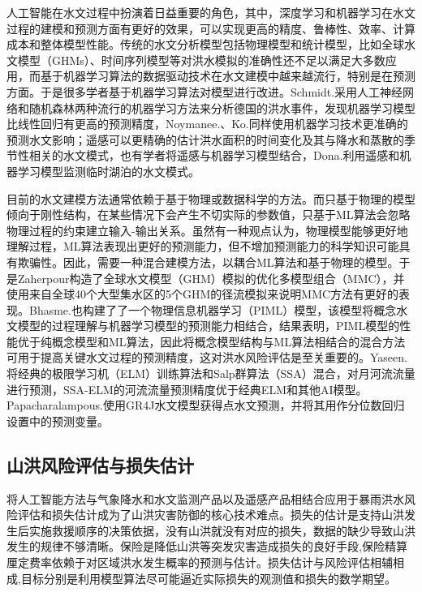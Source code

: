 \documentclass{ctexart}
\begin{document}
人工智能在水文过程中扮演着日益重要的角色\cite{nearing2021role}，其中，深度学习和机器学习在水文过程的建模和预测方面有更好的效果，可以实现更高的精度、鲁棒性、效率、计算成本和整体模型性能\cite{ardabili2019deep}。传统的水文分析模型包括物理模型和统计模型，比如全球水文模型（GHMs）、时间序列模型等对洪水模拟的准确性还不足以满足大多数应用，而基于机器学习算法的数据驱动技术在水文建模中越来越流行，特别是在预测方面\cite{carbajal2018overview}。于是很多学者基于机器学习算法对模型进行改进。Schmidt.\cite{schmidt2020challenges}采用人工神经网络和随机森林两种流行的机器学习方法来分析德国的洪水事件，发现机器学习模型比线性回归有更高的预测精度，Noymanee.\cite{noymanee2019flood}、Ko.\cite{ko2020development}同样使用机器学习技术更准确的预测水文影响；遥感可以更精确的估计洪水面积的时间变化及其与降水和蒸散的季节性相关的水文模式，也有学者将遥感与机器学习模型结合，Dona.\cite{dona2016monitoring}利用遥感和机器学习模型监测临时湖泊的水文模式。

目前的水文建模方法通常依赖于基于物理或数据科学的方法。而只基于物理的模型倾向于刚性结构，在某些情况下会产生不切实际的参数值，只基于ML算法会忽略物理过程的约束建立输入-输出关系。虽然有一种观点认为，物理模型能够更好地理解过程，ML算法表现出更好的预测能力，但不增加预测能力的科学知识可能具有欺骗性。因此，需要一种混合建模方法，以耦合ML算法和基于物理的模型。于是Zaherpour\cite{zaherpour2019exploring}构造了全球水文模型（GHM）模拟的优化多模型组合（MMC），并使用来自全球40个大型集水区的5个GHM的径流模拟来说明MMC方法有更好的表现。Bhasme.\cite{bhasme2021enhancing}也构建了了一个物理信息机器学习（PIML）模型，该模型将概念水文模型的过程理解与机器学习模型的预测能力相结合，结果表明，PIML模型的性能优于纯概念模型和ML算法，因此将概念模型结构与ML算法相结合的混合方法可用于提高关键水文过程的预测精度，这对洪水风险评估是至关重要的。Yaseen.\cite{yaseen2020hybridized}将经典的极限学习机（ELM）训练算法和Salp群算法（SSA）混合，对月河流流量进行预测，SSA-ELM的河流流量预测精度优于经典ELM和其他AI模型。Papacharalampous.\cite{papacharalampous2019probabilistic}使用GR4J水文模型获得点水文预测，并将其用作分位数回归设置中的预测变量。



\subsection{山洪风险评估与损失估计}


将人工智能方法与气象降水和水文监测产品以及遥感产品相结合应用于暴雨洪水风险评估和损失估计成为了山洪灾害防御的核心技术难点。损失的估计是支持山洪发生后实施救援顺序的决策依据，没有山洪就没有对应的损失，数据的缺少导致山洪发生的规律不够清晰。保险是降低山洪等突发灾害造成损失的良好手段,保险精算厘定费率依赖于对区域洪水发生概率的预测与估计。损失估计与风险评估相辅相成,目标分别是利用模型算法尽可能逼近实际损失的观测值和损失的数学期望。
\end{document}
